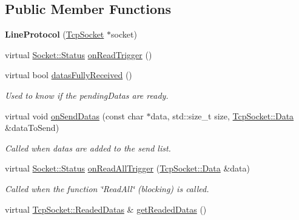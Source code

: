 \subsection*{Public Member Functions}
\begin{DoxyCompactItemize}
\item 
\hypertarget{classmognetwork_1_1protocol_1_1_line_protocol_ac0c9169a688b381838102b8411c73523}{{\bfseries Line\-Protocol} (\hyperlink{classmognetwork_1_1_tcp_socket}{Tcp\-Socket} $\ast$socket)}\label{classmognetwork_1_1protocol_1_1_line_protocol_ac0c9169a688b381838102b8411c73523}

\item 
virtual \hyperlink{classmognetwork_1_1_socket_aa187a8394ac0d6203af0ec7f021ca15f}{Socket\-::\-Status} \hyperlink{classmognetwork_1_1protocol_1_1_line_protocol_ac1d788d43b8ac54ce3bb3cf14f777bd8}{on\-Read\-Trigger} ()
\item 
virtual bool \hyperlink{classmognetwork_1_1protocol_1_1_line_protocol_af5f37db8e6254d04161dd491aea2b3c5}{datas\-Fully\-Received} ()
\begin{DoxyCompactList}\small\item\em Used to know if the pending\-Datas are ready. \end{DoxyCompactList}\item 
virtual void \hyperlink{classmognetwork_1_1protocol_1_1_line_protocol_a05705135aa4f8fbb24a75e441bf30129}{on\-Send\-Datas} (const char $\ast$data, std\-::size\-\_\-t size, \hyperlink{classmognetwork_1_1_tcp_socket_aa80d910649a16cedb6c98297e5893ed1}{Tcp\-Socket\-::\-Data} \&data\-To\-Send)
\begin{DoxyCompactList}\small\item\em Called when datas are added to the send list. \end{DoxyCompactList}\item 
virtual \hyperlink{classmognetwork_1_1_socket_aa187a8394ac0d6203af0ec7f021ca15f}{Socket\-::\-Status} \hyperlink{classmognetwork_1_1protocol_1_1_line_protocol_a37a081b6c4fa74d398999724be1cac23}{on\-Read\-All\-Trigger} (\hyperlink{classmognetwork_1_1_tcp_socket_aa80d910649a16cedb6c98297e5893ed1}{Tcp\-Socket\-::\-Data} \&data)
\begin{DoxyCompactList}\small\item\em Called when the function \char`\"{}\-Read\-All\char`\"{} (blocking) is called. \end{DoxyCompactList}\item 
virtual \hyperlink{structmognetwork_1_1_tcp_socket_1_1_readed_datas}{Tcp\-Socket\-::\-Readed\-Datas} \& \hyperlink{classmognetwork_1_1protocol_1_1_line_protocol_a9ff8883070a749f99d4538320332c439}{get\-Readed\-Datas} ()

\end{DoxyCompactItemize}
